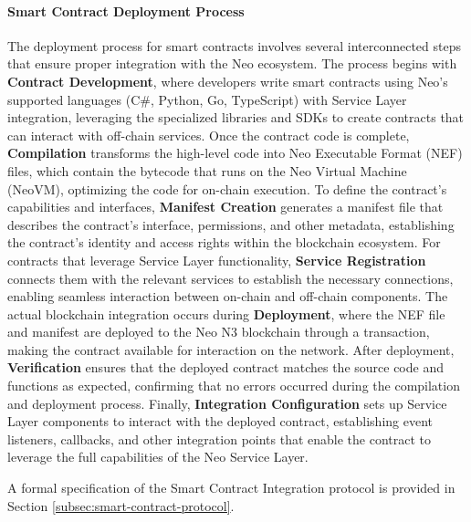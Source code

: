 \documentclass[12pt,a4paper]{article}
\begin{document}
\paragraph{Smart Contract Deployment Process}
The deployment process for smart contracts involves several interconnected steps that ensure proper integration with the Neo ecosystem. The process begins with \textbf{Contract Development}, where developers write smart contracts using Neo's supported languages (C\#, Python, Go, TypeScript) with Service Layer integration, leveraging the specialized libraries and SDKs to create contracts that can interact with off-chain services. Once the contract code is complete, \textbf{Compilation} transforms the high-level code into Neo Executable Format (NEF) files, which contain the bytecode that runs on the Neo Virtual Machine (NeoVM), optimizing the code for on-chain execution. To define the contract's capabilities and interfaces, \textbf{Manifest Creation} generates a manifest file that describes the contract's interface, permissions, and other metadata, establishing the contract's identity and access rights within the blockchain ecosystem. For contracts that leverage Service Layer functionality, \textbf{Service Registration} connects them with the relevant services to establish the necessary connections, enabling seamless interaction between on-chain and off-chain components. The actual blockchain integration occurs during \textbf{Deployment}, where the NEF file and manifest are deployed to the Neo N3 blockchain through a transaction, making the contract available for interaction on the network. After deployment, \textbf{Verification} ensures that the deployed contract matches the source code and functions as expected, confirming that no errors occurred during the compilation and deployment process. Finally, \textbf{Integration Configuration} sets up Service Layer components to interact with the deployed contract, establishing event listeners, callbacks, and other integration points that enable the contract to leverage the full capabilities of the Neo Service Layer.

A formal specification of the Smart Contract Integration protocol is provided in Section \ref{subsec:smart-contract-protocol}.


\end{document}
